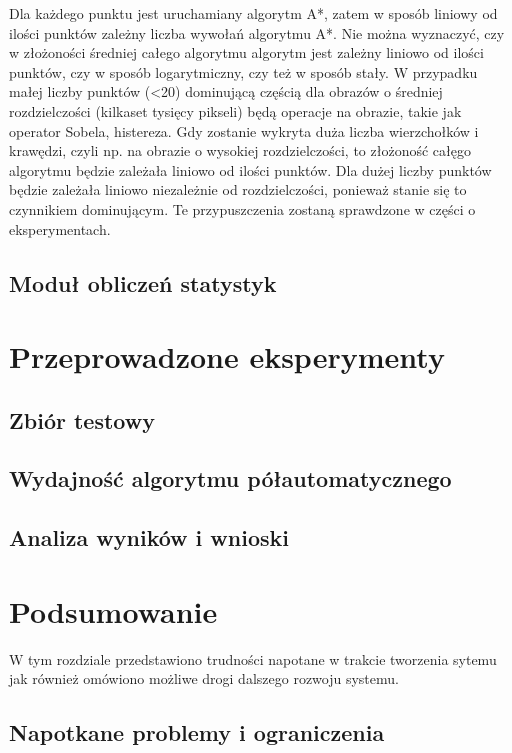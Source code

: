 \documentclass[a4paper,11pt,twoside]{report}
\theoremstyle{definition}
\begin{document}
\begin{enumerate}
Dla każdego punktu jest uruchamiany algorytm A*, zatem w sposób liniowy od ilości punktów zależny liczba wywołań algorytmu A*. Nie można wyznaczyć, czy w złożoności średniej całego algorytmu algorytm jest zależny liniowo od ilości punktów, czy w sposób logarytmiczny, czy też w sposób stały. W przypadku małej liczby punktów (<20) dominującą częścią dla obrazów o średniej rozdzielczości (kilkaset tysięcy pikseli) będą operacje na obrazie, takie jak operator Sobela, histereza. Gdy zostanie wykryta duża liczba wierzchołków i krawędzi, czyli np. na obrazie o wysokiej rozdzielczości, to złożoność całęgo algorytmu będzie zależała liniowo od ilości punktów. Dla dużej liczby punktów będzie zależała liniowo niezależnie od rozdzielczości, ponieważ stanie się to czynnikiem dominującym. Te przypuszczenia zostaną sprawdzone w części o eksperymentach.
\end{enumerate}

\section {Moduł obliczeń statystyk}

\chapter {Przeprowadzone eksperymenty}

\section {Zbiór testowy}

\section {Wydajność algorytmu półautomatycznego}

\section {Analiza wyników i wnioski}


\chapter {Podsumowanie}

W tym rozdziale przedstawiono trudności napotane w trakcie tworzenia sytemu jak również omówiono możliwe drogi dalszego rozwoju systemu.

\section {Napotkane problemy i ograniczenia}
\end{document}
